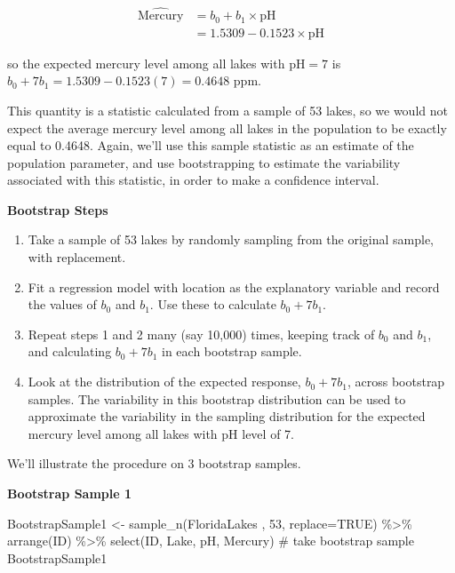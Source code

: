 \documentclass[
  letterpaper,
  DIV=11,
  numbers=noendperiod]{scrreprt}
\newenvironment{Shaded}{\begin{snugshade}}{\end{snugshade}}
\newcommand{\AttributeTok}[1]{\textcolor[rgb]{0.40,0.45,0.13}{#1}}
\newcommand{\CommentTok}[1]{\textcolor[rgb]{0.37,0.37,0.37}{#1}}
\newcommand{\ConstantTok}[1]{\textcolor[rgb]{0.56,0.35,0.01}{#1}}
\newcommand{\DecValTok}[1]{\textcolor[rgb]{0.68,0.00,0.00}{#1}}
\newcommand{\FunctionTok}[1]{\textcolor[rgb]{0.28,0.35,0.67}{#1}}
\newcommand{\NormalTok}[1]{\textcolor[rgb]{0.00,0.23,0.31}{#1}}
\newcommand{\OtherTok}[1]{\textcolor[rgb]{0.00,0.23,0.31}{#1}}
\newcommand{\SpecialCharTok}[1]{\textcolor[rgb]{0.37,0.37,0.37}{#1}}
\begin{document}
\[
\begin{aligned}
\widehat{\text{Mercury}} & = b_0 + b_1\times\text{pH} \\
& = 1.5309 - 0.1523\times\text{pH}
\end{aligned}
\]

so the expected mercury level among all lakes with \(\text{pH} = 7\) is
\(b_0+7b_1 = 1.5309-0.1523(7)=0.4648\) ppm.

This quantity is a statistic calculated from a sample of 53 lakes, so we
would not expect the average mercury level among all lakes in the
population to be exactly equal to 0.4648. Again, we'll use this sample
statistic as an estimate of the population parameter, and use
bootstrapping to estimate the variability associated with this
statistic, in order to make a confidence interval.

\textbf{Bootstrap Steps}

\begin{enumerate}
\def\labelenumi{\arabic{enumi}.}
\item
  Take a sample of 53 lakes by randomly sampling from the original
  sample, with replacement.
\item
  Fit a regression model with location as the explanatory variable and
  record the values of \(b_0\) and \(b_1\). Use these to calculate
  \(b_0+7b_1\).
\item
  Repeat steps 1 and 2 many (say 10,000) times, keeping track of \(b_0\)
  and \(b_1\), and calculating \(b_0+7b_1\) in each bootstrap sample.
\item
  Look at the distribution of the expected response, \(b_0 + 7b_1\),
  across bootstrap samples. The variability in this bootstrap
  distribution can be used to approximate the variability in the
  sampling distribution for the expected mercury level among all lakes
  with pH level of 7.
\end{enumerate}

We'll illustrate the procedure on 3 bootstrap samples.

\textbf{Bootstrap Sample 1}

\begin{Shaded}
\begin{Highlighting}[]
\NormalTok{BootstrapSample1 }\OtherTok{\textless{}{-}} \FunctionTok{sample\_n}\NormalTok{(FloridaLakes , }\DecValTok{53}\NormalTok{, }\AttributeTok{replace=}\ConstantTok{TRUE}\NormalTok{)  }\SpecialCharTok{\%\textgreater{}\%} \FunctionTok{arrange}\NormalTok{(ID) }\SpecialCharTok{\%\textgreater{}\%} 
  \FunctionTok{select}\NormalTok{(ID, Lake, pH, Mercury)   }\CommentTok{\# take bootstrap sample}
\NormalTok{BootstrapSample1}
\end{Highlighting}
\end{Shaded}
\end{document}
